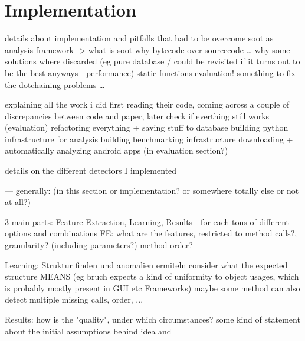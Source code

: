 \chapter{Implementation}
details about implementation and pitfalls that had to be overcome
    soot as analysis framework -> what is soot
    why bytecode over sourcecode
    \ldots
why some solutions where discarded (eg pure database / could be revisited if it turns out to be the best anyways - performance)
    static functions evaluation!
    something to fix the dotchaining problems
    \ldots

explaining all the work i did
    first reading their code, coming across a couple of discrepancies between code and paper, later check if everthing still works (evaluation)
    refactoring everything + saving stuff to database
    building python infrastructure for analysis
    building benchmarking infrastructure
    downloading + automatically analyzing android apps (in evaluation section?)
    
details on the different detectors I implemented

--- generally: (in this section or implementation? or somewhere totally else or not at all?)

3 main parts: Feature Extraction, Learning, Results -	for each tons of different options and combinations
FE:
    what are the features, restricted to method calls?, granularity? (including parameters?)
    method order?

Learning:
    Struktur finden und anomalien ermiteln	
    consider what the expected structure MEANS (eg bruch expects a kind of uniformity to object usages, which is probably mostly present in GUI etc Frameworks)
    maybe some method can also detect multiple missing calls, order, ...

Results:
	how is the "quality", under which circumstances?
	some kind of statement about the initial assumptions behind idea and 
